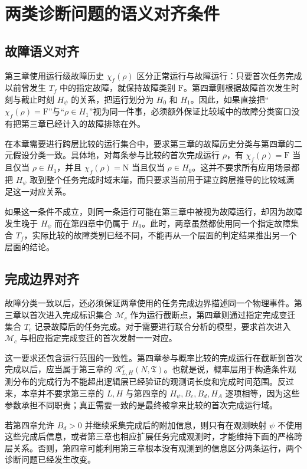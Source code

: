 \documentclass[master,fontset=ubuntu]{shnuthesis}
\theoremstyle{definition}
\begin{document}
\section{两类诊断问题的语义对齐条件}

\subsection{故障语义对齐}

第三章使用运行级故障历史 \(\chi_f(\rho)\) 区分正常运行与故障运行：只要首次任务完成以前曾发生 \(T_f\) 中的指定故障，就保持故障类别 \(\mathrm F\)。第四章则根据故障首次发生时刻与截止时刻 \(H_\psi\) 的关系，把运行划分为 \(H_0\) 和 \(H_1\)。因此，如果直接把“\(\chi_f(\rho)=\mathrm F\)”与“\(\rho\in H_1\)”视为同一件事，必须额外保证比较域中的故障分类窗口没有把第三章已经计入的故障排除在外。

在本章需要进行跨层比较的运行集合中，要求第三章的故障历史分类与第四章的二元假设分类一致。具体地，对每条参与比较的首次完成运行 \(\rho\)，有 \(\chi_f(\rho)=\mathrm F\) 当且仅当 \(\rho\in H_1\)，并且 \(\chi_f(\rho)=\mathrm N\) 当且仅当 \(\rho\in H_0\)。这并不要求所有应用场景都把 \(H_\psi\) 取到整个任务完成时域末端，而只要求当前用于建立跨层推导的比较域满足这一对应关系。

如果这一条件不成立，则同一条运行可能在第三章中被视为故障运行，却因为故障发生晚于 \(H_\psi\) 而在第四章中仍属于 \(H_0\)。此时，两章虽然都使用同一个指定故障集合 \(T_f\)，实际比较的故障类别已经不同，不能再从一个层面的判定结果推出另一个层面的结论。

\subsection{完成边界对齐}

故障分类一致以后，还必须保证两章使用的任务完成边界描述同一个物理事件。第三章以首次进入完成标识集合 \(\mathcal M_c\) 作为运行截断点，第四章则通过指定完成变迁集合 \(T_c\) 记录故障后的任务完成。对于需要进行联合分析的模型，要求首次进入 \(\mathcal M_c\) 与相应指定完成变迁的首次发射一一对应。

这一要求还包含运行范围的一致性。第四章参与概率比较的完成运行在截断到首次完成以后，应当属于第三章的 \(\mathcal R^c_{L,H}(N,\mathfrak T)\)。也就是说，概率层用于构造条件观测分布的完成行为不能超出逻辑层已经验证的观测词长度和完成时间范围。反过来，本章并不要求第三章的 \(L,H\) 与第四章的 \(H_\psi,B_c,B_d,H_A\) 逐项相等，因为这些参数承担不同职责；真正需要一致的是最终被拿来比较的首次完成运行域。

若第四章允许 \(B_d>0\) 并继续采集完成后的附加信息，则只有在观测映射 \(\psi\) 不使用这些完成后信息，或者第三章也相应扩展任务完成观测时，才能维持下面的严格跨层关系。否则，第四章可能利用第三章根本没有观测到的信息区分两条运行，两个诊断问题已经发生改变。
\end{document}
